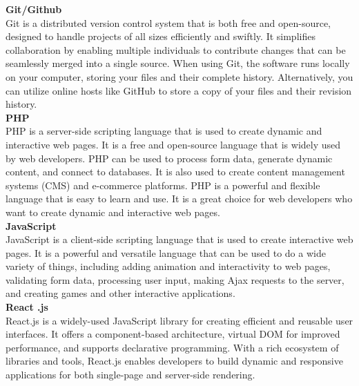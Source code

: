 \textbf{Git/Github}\\
Git is a distributed version control system that is both free and open-source, designed to handle projects of all sizes efficiently and swiftly. It simplifies collaboration by enabling multiple individuals to contribute changes that can be seamlessly merged into a single source. When using Git, the software runs locally on your computer, storing your files and their complete history. Alternatively, you can utilize online hosts like GitHub to store a copy of your files and their revision history.\\
\textbf{PHP}\\
PHP is a server-side scripting language that is used to create dynamic and interactive web pages. It is a free and open-source language that is widely used by web developers. PHP can be used to process form data, generate dynamic content, and connect to databases. It is also used to create content management systems (CMS) and e-commerce platforms.
PHP is a powerful and flexible language that is easy to learn and use. It is a great choice for web developers who want to create dynamic and interactive web pages.\\
\textbf{JavaScript}\\
JavaScript is a client-side scripting language that is used to create interactive web pages. It is a powerful and versatile language that can be used to do a wide variety of things, including adding animation and interactivity to web pages, validating form data, processing user input, making Ajax requests to the server, and creating games and other interactive applications.\\
\textbf{React .js}\\
React.js is a widely-used JavaScript library for creating efficient and reusable user interfaces. It offers a component-based architecture, virtual DOM for improved performance, and supports declarative programming. With a rich ecosystem of libraries and tools, React.js enables developers to build dynamic and responsive applications for both single-page and server-side rendering.\\
